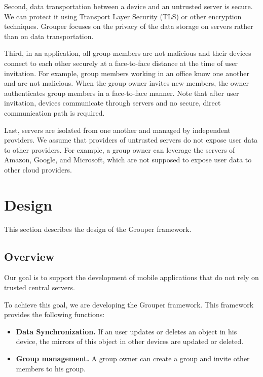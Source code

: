 \documentclass[sigconf]{acmart}
\begin{document}
Second, data transportation between a device and an untrusted server is secure.
We can protect it using Transport Layer Security (TLS) or other encryption techniques.
Grouper focuses on the privacy of the data storage on servers rather than on data transportation.

Third, in an application, all group members are not malicious and their devices connect to each other securely at a face-to-face distance at the time of user invitation.
For example, group members working in an office know one another and are not malicious.
When the group owner invites new members, the owner authenticates group members in a face-to-face manner.
Note that after user invitation, devices communicate through servers and no secure, direct communication path is required.

Last, servers are isolated from one another and managed by independent providers.
We assume that providers of untrusted servers do not expose user data to other providers.
For example, a group owner can leverage the servers of Amazon, Google, and Microsoft, which are not supposed to expose user data to other cloud providers.

\section{Design}

This section describes the design of the Grouper framework.

\subsection{Overview}

Our goal is to support the development of mobile applications that do not rely on trusted central servers.

To achieve this goal, we are developing the Grouper framework.
This framework provides the following functions:

\begin{itemize}
	\setlength{\itemsep}{1pt}
	\setlength{\parskip}{0pt}
	\setlength{\parsep}{0pt}
	\item \textbf{Data Synchronization.} 
	If an user updates or deletes an object in his device, the mirrors of this object in other devices are updated or deleted.
	\item \textbf{Group management.} 
	A group owner can create a group and invite other members to his group.
\end{itemize}
\end{document}
